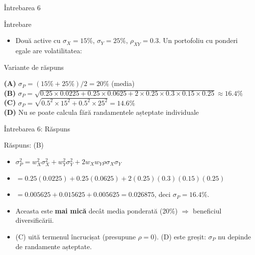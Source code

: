 \documentclass[9pt, aspectratio=169, t]{beamer}
\theoremstyle{definition}
\newenvironment{cminipage}[1]{%
    \par\noindent\hfill\begin{minipage}{#1}\ignorespaces
}{%
    \end{minipage}\hfill\null\par
}
\begin{document}
\begin{frame}{Întrebarea 6}
    \begin{cminipage}{0.95\textwidth}
    \begin{alertblock}{Întrebare}
        \begin{itemize}
            \item Două active cu $\sigma_X=15\%$, $\sigma_Y=25\%$, $\rho_{XY}=0.3$. Un portofoliu cu ponderi egale are volatilitatea:
        \end{itemize}
    \end{alertblock}

    \vspace{0.3cm}

    \begin{block}{Variante de răspuns}

        \textcolor{MainBlue}{\textbf{(A)}} $\sigma_P = (15\% + 25\%)/2 = 20\%$ (media)\\[3pt]

        \textcolor{MainBlue}{\textbf{(B)}} $\sigma_P = \sqrt{0.25 \times 0.0225 + 0.25 \times 0.0625 + 2 \times 0.25 \times 0.3 \times 0.15 \times 0.25} \approx 16.4\%$\\[3pt]

        \textcolor{MainBlue}{\textbf{(C)}} $\sigma_P = \sqrt{0.5^2 \times 15^2 + 0.5^2 \times 25^2} = 14.6\%$\\[3pt]

        \textcolor{MainBlue}{\textbf{(D)}} Nu se poate calcula fără randamentele așteptate individuale

    \end{block}
    \end{cminipage}
\end{frame}

\begin{frame}{Întrebarea 6: Răspuns}
    \begin{cminipage}{0.95\textwidth}
    \begin{exampleblock}{Răspuns: (B)}
    \begin{itemize}
        \item $\sigma_P^2 = w_X^2\sigma_X^2 + w_Y^2\sigma_Y^2 + 2w_Xw_Y\rho\sigma_X\sigma_Y$
        \item $= 0.25(0.0225) + 0.25(0.0625) + 2(0.25)(0.3)(0.15)(0.25)$
        \item $= 0.005625 + 0.015625 + 0.005625 = 0.026875$, deci $\sigma_P = 16.4\%$.
        \item Aceasta este \textbf{mai mică} decât media ponderată (20\%) $\Rightarrow$ beneficiul diversificării.
        \item (C) uită termenul încrucișat (presupune $\rho=0$). (D) este greșit: $\sigma_P$ nu depinde de randamente așteptate.
    \end{itemize}
    \end{exampleblock}
    \end{cminipage}
\end{frame}
\end{document}
